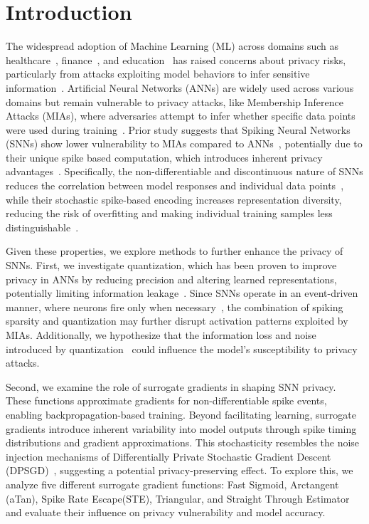 \section{Introduction}


\noindent
The widespread adoption of Machine Learning (ML) across domains such as healthcare~\cite{abouelmehdi2017big}, finance~\cite{tripathi2020financial}, and education~\cite{florea2020big} has raised concerns about privacy risks,  particularly from attacks exploiting model behaviors to infer sensitive information~\cite{liu2021machine, dwork2017exposed}. Artificial Neural Networks (ANNs) are widely used across various domains but remain vulnerable to privacy attacks, like Membership Inference Attacks (MIAs), where adversaries attempt to infer whether specific data points were used during training~\cite{golla2023security}. Prior study suggests that Spiking Neural Networks (SNNs) show lower vulnerability to MIAs compared to ANNs~\cite{Moshruba2024AreNA}, potentially due to their unique spike based computation, which introduces inherent privacy advantages~\cite{poursiami2024brainleaks}. Specifically, the non-differentiable and discontinuous nature of SNNs reduces the correlation between model responses and individual data points~\cite{meng2022training}, while their stochastic spike-based encoding increases representation diversity, reducing the risk of overfitting and making individual training samples less distinguishable~\cite{olin2021stochasticity}. 

Given these properties, we explore methods to further enhance the privacy of SNNs. First, we investigate quantization, which has been proven to improve privacy in ANNs by reducing precision and altering learned representations, potentially limiting information leakage~\cite{famili2023deep}. Since SNNs operate in an event-driven manner, where neurons fire only when necessary~\cite{schuman2022opportunities}, the combination of spiking sparsity and quantization may further disrupt activation patterns exploited by MIAs. Additionally, we hypothesize that the information loss and noise introduced by quantization~\cite{kang2024effect} could influence the model’s susceptibility to privacy attacks.


Second, we examine the role of surrogate gradients in shaping SNN privacy. These functions approximate gradients for non-differentiable spike events, enabling backpropagation-based training. Beyond facilitating learning, surrogate gradients introduce inherent variability into model outputs through spike timing distributions and gradient approximations. This stochasticity resembles the noise injection mechanisms of Differentially Private Stochastic Gradient Descent (DPSGD)~\cite{song2013stochastic}, suggesting a potential privacy-preserving effect. To explore this, we analyze five different surrogate gradient functions: Fast Sigmoid, Arctangent (aTan), Spike Rate Escape(STE), Triangular, and Straight Through Estimator \cite{eshraghian2021training} and evaluate their influence on privacy vulnerability and model accuracy.

